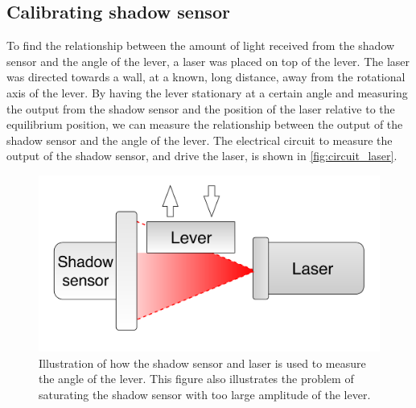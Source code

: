 \documentclass[english,a4paper,12pt,reprint]{revtex4-1}
\begin{document}
\subsection{Calibrating shadow sensor}
To find the relationship between the amount of light received from the shadow sensor and the angle of the lever, a laser was placed on top of the lever. The laser was directed towards a wall, at a known, long distance, away from the rotational axis of the lever. By having the lever stationary at a certain angle and measuring the output from the shadow sensor and the position of the laser relative to the equilibrium position, we can measure the relationship between the output of the shadow sensor and the angle of the lever. The electrical circuit to measure the output of the shadow sensor, and drive the laser, is shown in \vref{fig:circuit_laser}.

\begin{figure}[h!]
  \centering
  \includegraphics[scale=0.21]{shadow_sensor.pdf}
  \caption{Illustration of how the shadow sensor and laser is used to measure the angle of the lever. This figure also illustrates the problem of saturating the shadow sensor with too large amplitude of the lever.}
  \label{fig:shadow_sens}
\end{figure}
\end{document}

